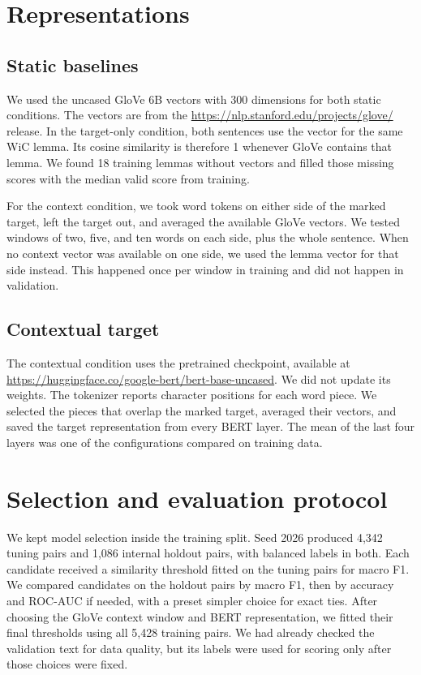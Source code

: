 \documentclass[11pt]{article}
\begin{document}
\section{Representations}
\subsection{Static baselines}
We used the uncased GloVe 6B vectors with 300 dimensions for both static
conditions. The vectors are from the
\url{https://nlp.stanford.edu/projects/glove/} release. In the target-only
condition, both sentences use the vector for the same WiC lemma. Its cosine
similarity is therefore 1 whenever GloVe contains that lemma. We found 18
training lemmas without vectors and filled those missing scores with the median
valid score from training.

For the context condition, we took word tokens on either side of the marked
target, left the target out, and averaged the available GloVe vectors. We tested
windows of two, five, and ten words on each side, plus the whole sentence. When
no context vector was available on one side, we used the lemma vector for that
side instead. This happened once per window in training and did not happen in
validation.

\subsection{Contextual target}
The contextual condition uses the pretrained
 checkpoint, available at
\url{https://huggingface.co/google-bert/bert-base-uncased}. We did not update its
weights. The tokenizer reports character positions for each word piece. We
selected the pieces that overlap the marked target, averaged their vectors, and
saved the target representation from every BERT layer. The mean of the last
four layers was one of the configurations compared on training data.

\section{Selection and evaluation protocol}
We kept model selection inside the training split. Seed 2026 produced 4,342
tuning pairs and 1,086 internal holdout pairs, with balanced labels in both.
Each candidate received a similarity threshold fitted on the tuning pairs for
macro F1. We compared candidates on the holdout pairs by macro F1, then by
accuracy and ROC-AUC if needed, with a preset simpler choice for exact ties.
After choosing the GloVe context window and BERT representation, we fitted
their final thresholds using all 5,428 training pairs. We had already checked
the validation text for data quality, but its labels were used for scoring only
after those choices were fixed.
\end{document}

